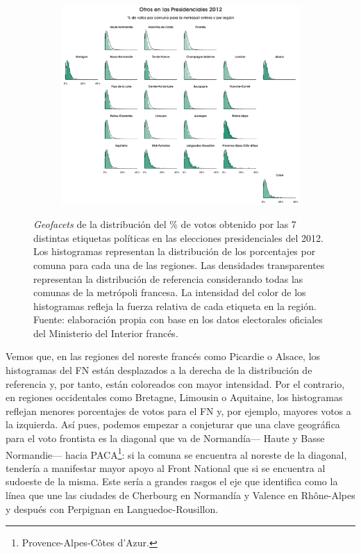 \begin{figure}[h]
\begin{subfigure}{0.3\textwidth}
	\includegraphics[width = \textwidth]{Figs/AED/Geofacet_Distr_por_Reg_P12_Otros}
	\end{subfigure}
	\caption{\textit{Geofacets} de la distribución del \% de votos obtenido por las 7 distintas etiquetas políticas en las elecciones presidenciales del 2012. Los histogramas representan la distribución de los porcentajes por comuna para cada una de las regiones. Las densidades transparentes representan la distribución de referencia considerando todas las comunas de la metrópoli francesa. La intensidad del color de los histogramas refleja la fuerza relativa de cada etiqueta en la región. Fuente: elaboración propia con base en los datos electorales oficiales del Ministerio del Interior francés.}
	\label{fig:Geofacet_Distr_Reg_P12}	
\end{figure}

Vemos que, en las regiones del noreste francés como Picardie o Alsace, los histogramas del FN están desplazados a la derecha de la distribución de referencia y, por tanto, están coloreados con mayor intensidad. Por el contrario, en regiones occidentales como Bretagne, Limousin o Aquitaine, los histogramas reflejan menores porcentajes de votos para el FN y, por ejemplo, mayores votos a la izquierda. Así pues, podemos empezar a conjeturar que una clave geográfica para el voto frontista es la diagonal que va de Normandía--- Haute y Basse Normandie--- hacia PACA\footnote{Provence-Alpes-Côtes d'Azur.}: si la comuna se encuentra al noreste de la diagonal, tendería a manifestar mayor apoyo al Front National que si se encuentra al sudoeste de la misma. Este sería a grandes rasgos el eje que \textcite{Goodliffe16} identifica como la línea que une las ciudades de Cherbourg en Normandía y Valence en Rhône-Alpes y después con Perpignan en Languedoc-Rousillon.\\ 

